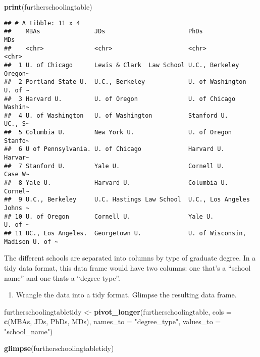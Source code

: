 \documentclass[
]{article}
\newenvironment{Shaded}{\begin{snugshade}}{\end{snugshade}}
\newcommand{\AttributeTok}[1]{\textcolor[rgb]{0.13,0.29,0.53}{#1}}
\newcommand{\FunctionTok}[1]{\textcolor[rgb]{0.13,0.29,0.53}{\textbf{#1}}}
\newcommand{\NormalTok}[1]{#1}
\newcommand{\OtherTok}[1]{\textcolor[rgb]{0.56,0.35,0.01}{#1}}
\newcommand{\StringTok}[1]{\textcolor[rgb]{0.31,0.60,0.02}{#1}}
\providecommand{\tightlist}{%
  \setlength{\itemsep}{0pt}\setlength{\parskip}{0pt}}
\begin{document}
\begin{Shaded}
\begin{Highlighting}[]
\FunctionTok{print}\NormalTok{(furtherschoolingtable)}
\end{Highlighting}
\end{Shaded}

\begin{verbatim}
## # A tibble: 11 x 4
##    MBAs               JDs                       PhDs                     MDs    
##    <chr>              <chr>                     <chr>                    <chr>  
##  1 U. of Chicago      Lewis & Clark  Law School U.C., Berkeley           Oregon~
##  2 Portland State U.  U.C., Berkeley            U. of Washington         U. of ~
##  3 Harvard U.         U. of Oregon              U. of Chicago            Washin~
##  4 U. of Washington   U. of Washington          Stanford U.              UC., S~
##  5 Columbia U.        New York U.               U. of Oregon             Stanfo~
##  6 U of Pennsylvania. U. of Chicago             Harvard U.               Harvar~
##  7 Stanford U.        Yale U.                   Cornell U.               Case W~
##  8 Yale U.            Harvard U.                Columbia U.              Cornel~
##  9 U.C., Berkeley     U.C. Hastings Law School  U.C., Los Angeles        Johns ~
## 10 U. of Oregon       Cornell U.                Yale U.                  U. of ~
## 11 UC., Los Angeles.  Georgetown U.             U. of Wisconsin, Madison U. of ~
\end{verbatim}

The different schools are separated into columns by type of graduate
degree. In a tidy data format, this data frame would have two columns:
one that's a ``school name'' and one thats a ``degree type''.

\begin{enumerate}
\def\labelenumi{\alph{enumi}.}
\setcounter{enumi}{2}
\tightlist
\item
  Wrangle the data into a tidy format. Glimpse the resulting data frame.
\end{enumerate}

\begin{Shaded}
\begin{Highlighting}[]
\NormalTok{  furtherschoolingtabletidy }\OtherTok{\textless{}{-}} \FunctionTok{pivot\_longer}\NormalTok{(furtherschoolingtable, }
                          \AttributeTok{cols =} \FunctionTok{c}\NormalTok{(MBAs, JDs, PhDs, MDs), }
                          \AttributeTok{names\_to =} \StringTok{"degree\_type"}\NormalTok{, }
                          \AttributeTok{values\_to =} \StringTok{"school\_name"}\NormalTok{)}


\FunctionTok{glimpse}\NormalTok{(furtherschoolingtabletidy)}
\end{Highlighting}
\end{Shaded}
\end{document}

